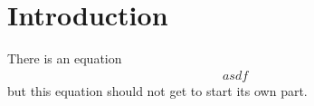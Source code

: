 \documentclass[10pt]{article}
\begin{document}
\section{Introduction}

There is an equation
\begin{align*}
asdf
\end{align*}
but this equation should not get to start its own part.
\end{document}
